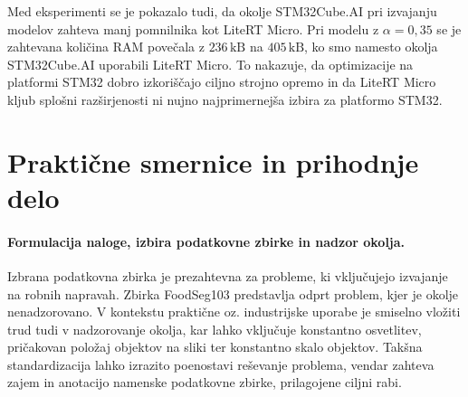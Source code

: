 \documentclass[a4paper,twoside,openright,12pt,slovene]{book}
\begin{document}

        Med eksperimenti se je pokazalo tudi, da okolje STM32Cube.AI pri
        izvajanju modelov zahteva manj pomnilnika kot LiteRT Micro. Pri modelu
        z \(\alpha=0{,}35\) se je zahtevana količina RAM povečala z
        \(236\,\mathrm{kB}\) na \(405\,\mathrm{kB}\), ko smo namesto okolja
        STM32Cube.AI uporabili LiteRT Micro. To nakazuje, da optimizacije na
        platformi STM32 dobro izkoriščajo ciljno strojno opremo in da LiteRT
        Micro kljub splošni razširjenosti ni nujno najprimernejša izbira za
        platformo STM32.

    
    \section{Praktične smernice in prihodnje delo}

        \paragraph{Formulacija naloge, izbira podatkovne zbirke in nadzor okolja.}
        Izbrana podatkovna zbirka je prezahtevna za
        probleme, ki vključujejo izvajanje na robnih napravah. Zbirka FoodSeg103
        predstavlja odprt problem, kjer je okolje nenadzorovano. V kontekstu
        praktične oz. industrijske uporabe je smiselno vložiti trud tudi v
        nadzorovanje okolja, kar lahko vključuje konstantno osvetlitev,
            pričakovan položaj objektov na sliki ter konstantno skalo objektov.
        Takšna standardizacija lahko izrazito poenostavi reševanje problema,
        vendar zahteva zajem in anotacijo namenske podatkovne zbirke,
        prilagojene ciljni rabi.
        
\end{document}
